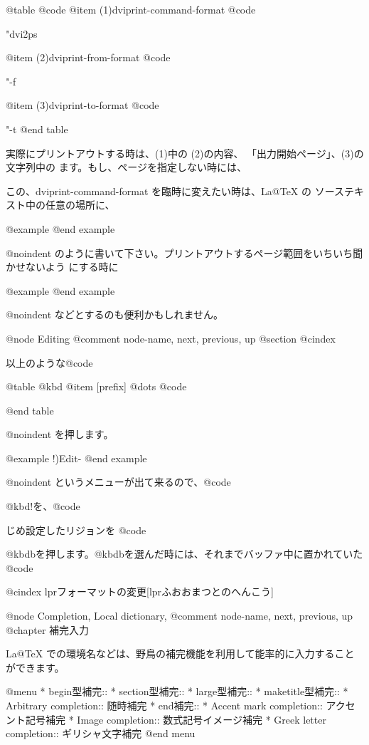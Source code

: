 {{{{{{{{{{{{{{@table @code
@item (1)dviprint-command-format
@code{"dvi2ps %

@item (2)dviprint-from-format
@code{"-f %

@item (3)dviprint-to-format
@code{"-t %
@end table

実際にプリントアウトする時は、(1)中の %
(2)の内容、%
「出力開始ページ」、(3)の文字列中の %
ます。もし、ページを指定しない時には、%

  この、dviprint-command-format を臨時に変えたい時は、La@TeX{} の
ソーステキスト中の任意の場所に、

@example
@end example

@noindent 
のように書いて下さい。プリントアウトするページ範囲をいちいち聞かせないよう
にする時に

@example
@end example

@noindent 
などとするのも便利かもしれません。

@node Editing %
@comment  node-name,  next,  previous,  up
@section %
@cindex %

以上のような@code{%

@table @kbd
@item [prefix] %
        @dots{} @code{%
@end table

@noindent 
を押します。

@example
        !)Edit-%
@end example

@noindent 
というメニューが出て来るので、@code{%
@kbd{!}を、@code{%
じめ設定したリジョンを @code{%
@kbd{b}を押します。@kbd{b}を選んだ時には、それまでバッファ中に置かれていた 
@code{%
@cindex lprフォーマットの変更[lprふおおまつとのへんこう]

@node Completion, Local dictionary, %
@comment  node-name,  next,  previous,  up
@chapter 補完入力

  La@TeX{} での環境名などは、野鳥の補完機能を利用して能率的に入力すること
ができます。

@menu
* begin型補完::                 
* section型補完::               
* large型補完::                 
* maketitle型補完::             
* Arbitrary completion::        随時補完
* end補完::                     
* Accent mark completion::      アクセント記号補完
* Image completion::            数式記号イメージ補完
* Greek letter completion::     ギリシャ文字補完
@end menu

}}}}}}}}}}}}}}}}}}}}}}}
